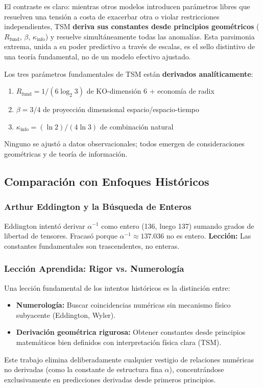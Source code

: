 \documentclass[11pt, a4paper]{article}
\theoremstyle{plain}
\theoremstyle{definition}
\newcommand{\Rfactor}{R_{\text{fund}}}
\newcommand{\Kinfo}{\kappa_{\text{info}}}
\begin{document}
El contraste es claro: mientras otros modelos introducen parámetros libres que resuelven una tensión a costa de exacerbar otra o violar restricciones independientes, TSM \textbf{deriva sus constantes desde principios geométricos} ($\Rfactor$, $\beta$, $\Kinfo$) y resuelve simultáneamente todas las anomalías. Esta parsimonia extrema, unida a su poder predictivo a través de escalas, es el sello distintivo de una teoría fundamental, no de un modelo efectivo ajustado.


Los tres parámetros fundamentales de TSM están \textbf{derivados analíticamente}:
\begin{enumerate}
    \item $\Rfactor = 1/(6\log_2 3)$ de KO-dimensión 6 + economía de radix
    \item $\beta = 3/4$ de proyección dimensional espacio/espacio-tiempo
    \item $\Kinfo = (\ln 2)/(4\ln 3)$ de combinación natural
\end{enumerate}

Ninguno se ajustó a datos observacionales; todos emergen de consideraciones geométricas y de teoría de información.

\subsection{Comparación con Enfoques Históricos}

\subsubsection{Arthur Eddington y la Búsqueda de Enteros}
Eddington intentó derivar $\alpha^{-1}$ como entero (136, luego 137) sumando grados de libertad de tensores. Fracasó porque $\alpha^{-1} \approx 137.036$ no es entero. \textbf{Lección:} Las constantes fundamentales son trascendentes, no enteras.

\subsubsection{Lección Aprendida: Rigor vs. Numerología}
Una lección fundamental de los intentos históricos es la distinción entre:
\begin{itemize}
    \item \textbf{Numerología:} Buscar coincidencias numéricas sin mecanismo físico subyacente (Eddington, Wyler).
    \item \textbf{Derivación geométrica rigurosa:} Obtener constantes desde principios matemáticos bien definidos con interpretación física clara (TSM).
\end{itemize}
Este trabajo elimina deliberadamente cualquier vestigio de relaciones numéricas no derivadas (como la constante de estructura fina $\alpha$), concentrándose exclusivamente en predicciones derivadas desde primeros principios.
\end{document}
